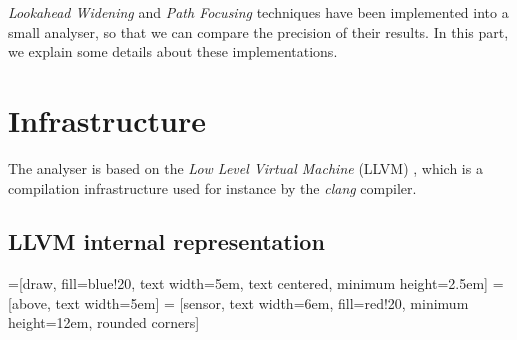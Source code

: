\documentclass[a4paper,english,titlepage,11pt]{report}
\begin{document}
\emph{Lookahead Widening} and \emph{Path Focusing}
techniques have been implemented into a small analyser, so that we can compare
the precision of their results. In this part, we explain some details about
these implementations.

 \section{Infrastructure}
The analyser is based on the \emph{Low Level Virtual Machine} (LLVM)
\cite{LLVM:CGO04}, which is a compilation infrastructure used for instance by
the \emph{clang} compiler.

\subsection{LLVM internal representation}

=[draw, fill=blue!20, text width=5em, 
    text centered, minimum height=2.5em]
 = [above, text width=5em]
 = [sensor, text width=6em, fill=red!20, 
    minimum height=12em, rounded corners]
\def\leftdist{2.3}
\def\rightdist{5.0}
\def\edgedist{2.5}
\end{document}

